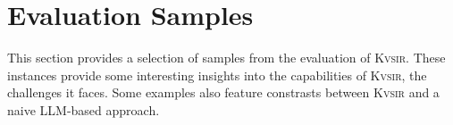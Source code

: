 \documentclass[sigplan,review,anonymous,10pt]{acmart}
\newcommand{\sys}{{\scshape Kv{\textalpha}sir}\xspace}
\newcommand{\heading}[1]{\vspace{2pt}\noindent\textbf{\emph{#1}}:\enspace}
\begin{document}






\appendix

\section{Evaluation Samples}
This section provides a selection of samples from the evaluation of \sys.
These instances provide some interesting insights into the capabilities of \sys, the challenges it faces.
Some examples also feature constrasts between \sys and a naive LLM-based approach.
\end{document}
